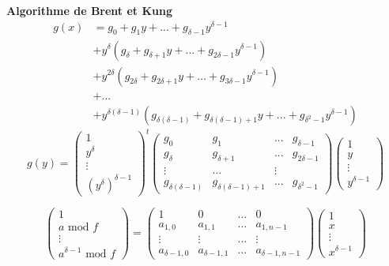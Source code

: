 \documentclass[10pt,a4paper]{beamer}
\begin{document}
\begin{frame}
    \textbf{Algorithme de Brent et Kung} 
    \begin{align*}
        g(x) &= g_0 + g_1y + ... + g_{\delta-1}y^{\delta-1} \\
            &+ y^\delta(g_\delta + g_{\delta+1}y + ... + g_{2\delta-1}y^{\delta-1}) \\
                                          &+ y^{2\delta}(g_{2\delta} + g_{2\delta+1}y + ... + g_{3\delta-1}y^{\delta-1}) \\
                                          &+ ... \\
                                          &+ y^{\delta(\delta-1)}(g_{\delta(\delta-1)} + g_{\delta(\delta-1)+1}y + ... + g_{\delta^2-1}y^{\delta-1}) 
    \end{align*}
    \[
    g(y) = 
    \begin{pmatrix}
        1 \\
        y^\delta \\
        \vdots \\
        (y^\delta)^{\delta-1} 
    \end{pmatrix}^t
    \begin{pmatrix}
        g_0 & g_1 & ... & g_{\delta-1} \\
        g_{\delta} & g_{\delta+1} & ... & g_{2\delta-1} \\
        \vdots & ... & \vdots \\
        g_{\delta(\delta-1)} & g_{\delta(\delta-1)+1} & ... & g_{\delta^2-1}
    \end{pmatrix}
    \begin{pmatrix}
        1 \\
        y \\
        \vdots \\
        y^{\delta-1}
    \end{pmatrix}
    \]
    
    \[
        \begin{pmatrix}
            1 \\
            a \text{ mod }f\\
            \vdots \\
            a^{\delta-1} \text{ mod }f
        \end{pmatrix}
        =
        \begin{pmatrix}
            1 & 0 & ... & 0 \\
            a_{1,0} & a_{1,1} & ... & a_{1,n-1} \\
            \vdots & \vdots & ... & \vdots \\
            a_{\delta-1,0} & a_{\delta-1,1} & ... & a_{\delta-1,n-1}
        \end{pmatrix}
        \begin{pmatrix}
            1 \\
            x \\
            \vdots \\
            x^{\delta-1}
        \end{pmatrix}
    \]
\end{frame}
\end{document}
